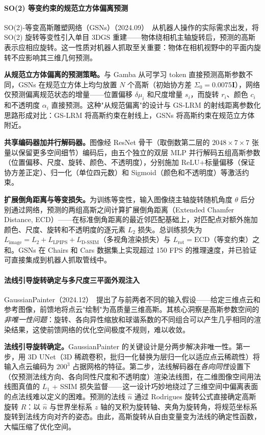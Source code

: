 \paragraph{SO(2) 等变约束的规范立方体偏离预测}

SO(2)-等变高斯雕塑网络（GSNs）（2024.09）~\cite{2409_07245}从机器人操作的实际需求出发，将 SO(2) 旋转等变性引入单目 3DGS 重建——物体绕相机主轴旋转后，预测的高斯表示应相应旋转。这一性质对机器人抓取至关重要：物体在相机视野中的平面内旋转不应影响其三维几何预测。

\textbf{从规范立方体偏离的预测策略。}与 Gamba 从可学习 token 直接预测高斯参数不同，GSNs 在规范立方体上均匀放置 $N$ 个高斯（初始协方差 $\Sigma_0 = 0.0075\mathbf{I}$），网络仅预测偏离规范状态的增量——位置偏移 $\delta\mu_i$ 和尺度增量 $s_i$，而旋转 $r_i$、颜色 $c_i$ 和不透明度 $\alpha_i$ 直接预测。这种"从规范偏离"的设计与 GS-LRM 的射线距离参数化思路形成对比：GS-LRM 将高斯约束在射线上，GSNs 将高斯约束在规范立方体附近。

\textbf{共享编码器加并行解码器。}图像经 ResNet 骨干（取倒数第二层的 $2048 \times 7 \times 7$ 张量以保留更多空间细节）编码后，由五个独立的双层 MLP 并行解码五组高斯参数（位置偏移、尺度、旋转、颜色、不透明度），分别施加 ReLU+标量偏移（保证协方差正定）、归一化（单位四元数）和 Sigmoid（颜色和不透明度）等激活约束。

\textbf{扩展倒角距离与等变损失。}为训练等变性，输入图像绕主轴旋转随机角度 $\theta$ 后分别通过网络，预测的两组高斯之间计算扩展倒角距离（Extended Chamfer Distance, ECD）——在标准倒角距离的最近邻匹配基础上，对匹配点对额外施加颜色、尺度、旋转和不透明度的逐元素 $L_2$ 损失。总训练损失为 $L_{\text{image}} = L_2 + L_{\text{LPIPS}} + L_{\text{D-SSIM}}$（多视角渲染损失）与 $L_{\text{rot}} = \text{ECD}$（等变约束）之和。GSNs 在 Chairs 和 Cars 数据集上实现超过 150 FPS 的推理速度，并已验证可直接集成到机器人抓取管线中。

\paragraph{法线引导旋转确定与多尺度三平面外观注入}

GaussianPainter（2024.12）~\cite{2412_17715}提出了与前两者不同的输入假设——给定三维点云和参考图像，前馈地将点云"绘制"为高质量三维高斯。其核心洞察是高斯参数空间的\emph{非唯一性问题}：旋转、各向异性缩放和球谐系数的不同组合可以产生几乎相同的渲染结果，这使前馈网络的优化空间极度不规则，难以收敛。

\textbf{法线引导旋转确定。}GaussianPainter 的关键设计是分两步解决非唯一性。第一步，用 3D UNet（3D 稀疏卷积，批归一化替换为层归一化以适应点云稀疏性）将输入点云编码为 $200^3$ 占据网格的特征。第二步，法线解码器在\emph{各向同性}设置下（仅预测法线方向、各向同性尺度和不透明度）渲染法线图，在二维图像空间用法线图真值的 $L_1$ + SSIM 损失监督——这一设计巧妙地绕过了三维空间中偏离表面的点法线难以定义的困难。预测的法线 $\hat{n}$ 通过 Rodrigues 旋转公式直接确定高斯旋转 $R$：以 $\hat{n}$ 与世界坐标系 $z$ 轴的叉积为旋转轴、夹角为旋转角，将规范坐标系旋转到法线方向对齐的姿态。由此，高斯旋转从自由变量变为法线的确定性函数，大幅压缩了优化空间。

